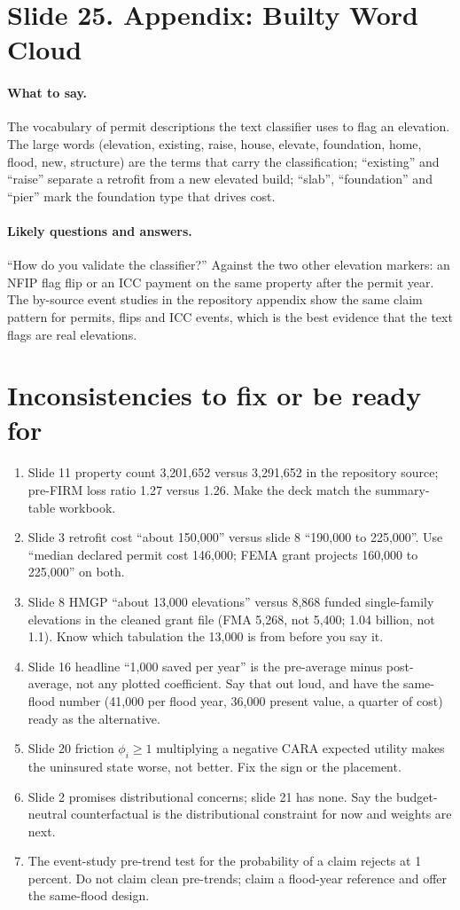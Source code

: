\documentclass[11pt]{article}
\newcommand{\slide}[2]{\section*{Slide #1. #2}\addcontentsline{toc}{section}{Slide #1. #2}}
\newcommand{\say}{\paragraph{What to say.}}
\newcommand{\qa}{\paragraph{Likely questions and answers.}}
\begin{document}
\slide{25}{Appendix: Builty Word Cloud}
\say The vocabulary of permit descriptions the text classifier uses to flag an elevation. The large words (elevation, existing, raise, house, elevate, foundation, home, flood, new, structure) are the terms that carry the classification; ``existing'' and ``raise'' separate a retrofit from a new elevated build; ``slab'', ``foundation'' and ``pier'' mark the foundation type that drives cost.

\qa ``How do you validate the classifier?'' Against the two other elevation markers: an NFIP flag flip or an ICC payment on the same property after the permit year. The by-source event studies in the repository appendix show the same claim pattern for permits, flips and ICC events, which is the best evidence that the text flags are real elevations.

\section*{Inconsistencies to fix or be ready for}
\begin{enumerate}
\item Slide 11 property count 3,201,652 versus 3,291,652 in the repository source; pre-FIRM loss ratio 1.27 versus 1.26. Make the deck match the summary-table workbook.
\item Slide 3 retrofit cost ``about 150,000'' versus slide 8 ``190,000 to 225,000''. Use ``median declared permit cost 146,000; FEMA grant projects 160,000 to 225,000'' on both.
\item Slide 8 HMGP ``about 13,000 elevations'' versus 8,868 funded single-family elevations in the cleaned grant file (FMA 5,268, not 5,400; 1.04 billion, not 1.1). Know which tabulation the 13,000 is from before you say it.
\item Slide 16 headline ``1,000 saved per year'' is the pre-average minus post-average, not any plotted coefficient. Say that out loud, and have the same-flood number (41,000 per flood year, 36,000 present value, a quarter of cost) ready as the alternative.
\item Slide 20 friction $\phi_i \ge 1$ multiplying a negative CARA expected utility makes the uninsured state worse, not better. Fix the sign or the placement.
\item Slide 2 promises distributional concerns; slide 21 has none. Say the budget-neutral counterfactual is the distributional constraint for now and weights are next.
\item The event-study pre-trend test for the probability of a claim rejects at 1 percent. Do not claim clean pre-trends; claim a flood-year reference and offer the same-flood design.
\end{enumerate}
\end{document}
